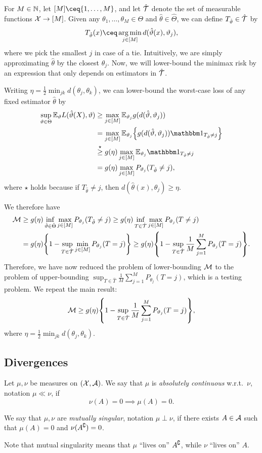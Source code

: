 For $M \in \NN$, let $[M] \ceq \qty{1, \dotsc, M}$, and let $\hat \TT$ denote the set of measurable functions $\XX \to [M]$. Given any $\theta_1, \dotsc, \theta_M \in \Theta$ and $\hat\theta \in \hat\Theta$, we can define $T_{\hat\theta} \in \hat\TT$ by
\[
T_{\hat\theta}(x) \ceq \argmin_{j \in [M]} d(\hat\theta(x), \theta_j), 
\]
where we pick the smallest $j$ in case of a tie. Intuitively, we are simply approximating $\hat\theta$ by the closest $\theta_j$. Now, we will lower-bound the minimax risk by an expression that only depends on estimators in $\hat\TT$. 

Writing $\eta = \frac12 \min_{jk} d(\theta_j, \theta_k)$, we can lower-bound the worst-case loss of any fixed estimator $\hat\theta$ by 
\begin{align*}
	\sup_{\theta \in \Theta} \EE_\theta L(\hat\theta(X), \theta) &\geq \max_{j \in [M]} \EE_{\theta_j} g(d(\hat\theta, \theta_j)) \\
	&= \max_{j \in [M]} \EE_{\theta_j} \qty{g(d(\hat\theta, \theta_j)) \ind_{T_{\hat\theta} \neq j}} \\
	&\overset\star\geq g(\eta) \max_{j \in [M]} \EE_{\theta_j} \ind_{T_{\hat\theta} \neq j} \\
	&= g(\eta) \max_{j \in [M]} P_{\theta_j}(T_{\hat\theta} \neq j), 
\end{align*}
where $\star$ holds because if $T_{\hat\theta} \neq j$, then $d(\hat\theta(x), \theta_j) \geq \eta$. 

We therefore have
\begin{align*}
	\Cal M &\geq g(\eta) \inf_{\hat\theta \in \hat\Theta} \max_{j \in [M]} P_{\theta_j}(T_{\hat\theta} \neq j) \geq g(\eta) \inf_{T \in \hat\TT} \max_{j \in [M]} P_{\theta_j}(T \neq j) \\
	&= g(\eta) \qty{1 - \sup_{T \in \hat\TT} \min_{j \in [M]} P_{\theta_j}(T = j)} \geq g(\eta) \qty{1 - \sup_{T \in \hat\TT} \frac1M \sum_{j=1}^M P_{\theta_j}(T = j)}. 
\end{align*}
Therefore, we have now reduced the problem of lower-bounding $\Cal M$ to the problem of upper-bounding $\sup_{T \in \hat T} \frac1M \sum_{j=1}^M P_{\theta_j}(T = j)$, which is a testing problem. We repeat the main result:
\begin{equation} \label{eq:red_to_testing}
	\Cal M \geq g(\eta) \qty{1 - \sup_{T \in \hat\TT} \frac1M\sum_{j=1}^M P_{\theta_j} (T = j)}, 
\end{equation}
where $\eta = \frac12 \min_{jk} d(\theta_j, \theta_k)$. 
\subsection{Divergences}
\begin{definition}
	Let $\mu, \nu$ be measures on $(\XX, \AA)$. We say that $\mu$ is \emph{absolutely continuous} w.r.t.\ $\nu$, notation $\mu \ll\nu$, if
	\[
	\nu(A) = 0 \implies \mu(A) = 0. 
	\]
	
	We say that $\mu, \nu$ are \emph{mutually singular}, notation $\mu \perp \nu$, if there exists $A \in \AA$ such that $\mu(A) = 0$ and $\nu(A\C) = 0$.
\end{definition}
Note that mutual singularity means that $\mu$ ``lives on'' $A\C$, while $\nu$ ``lives on'' $A$. 

